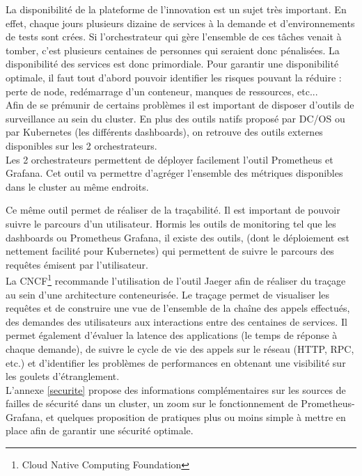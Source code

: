 \documentclass[11pt,fleqn]{book} %
\begin{document}
La disponibilité de la plateforme de l’innovation est un sujet très important. En effet, chaque jours plusieurs dizaine de services à la demande et d’environnements de tests sont crées. Si l’orchestrateur qui gère l’ensemble de ces tâches venait à tomber, c’est plusieurs centaines de personnes qui seraient donc pénalisées. La disponibilité des services est donc primordiale. Pour garantir une disponibilité optimale, il faut tout d’abord pouvoir identifier les risques pouvant la réduire : perte de node, redémarrage d’un conteneur, manques de ressources, etc... \\

Afin de se prémunir de certains problèmes il est important de disposer d’outils de surveillance au sein du cluster. En plus des outils natifs proposé par DC/OS ou par Kubernetes (les différents dashboards), on retrouve des outils externes disponibles sur les 2 orchestrateurs.\\

Les 2 orchestrateurs permettent de déployer facilement l'outil Prometheus et Grafana. Cet outil va permettre d'agréger l'ensemble des métriques disponibles dans le cluster au même endroits. 

Ce même outil permet de réaliser de la traçabilité. Il est important de pouvoir suivre le parcours d'un utilisateur. Hormis les outils de monitoring tel que les dashboards ou Prometheus Grafana, il existe des outils, (dont le déploiement est nettement facilité pour Kubernetes) qui permettent de suivre le parcours des requêtes émisent par l’utilisateur.\\

La CNCF\footnote{Cloud Native Computing Foundation} recommande l’utilisation de l’outil Jaeger afin de réaliser du traçage au sein d’une architecture conteneurisée. Le traçage permet de visualiser les requêtes et de construire une vue de l’ensemble de la chaîne des appels effectués, des demandes des utilisateurs aux interactions entre des centaines de services. Il permet également d’évaluer la latence des applications (le temps de réponse à chaque demande), de suivre le cycle de vie des appels sur le réseau (HTTP, RPC, etc.) et d’identifier les problèmes de performances en obtenant une visibilité sur les goulets d’étranglement.\\

L'annexe \ref{securite} propose des informations complémentaires sur les sources de failles de sécurité dans un cluster, un zoom sur le fonctionnement de Prometheus-Grafana, et quelques proposition de pratiques plus ou moins simple à mettre en place afin de garantir une sécurité optimale. 
\end{document}
